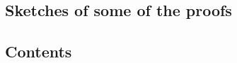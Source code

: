 \documentclass[oneside,openany,a4paper]{memoir}
\begin{document}
\begin{refsection}
  \chapter{Sketches of some of the proofs}

  

  \startcontents[chapters]
  \section*{Contents}
  \clearpage

  
  \clearpage

  \printbibliography[heading=subbibliography]
\end{refsection}
\end{document}
